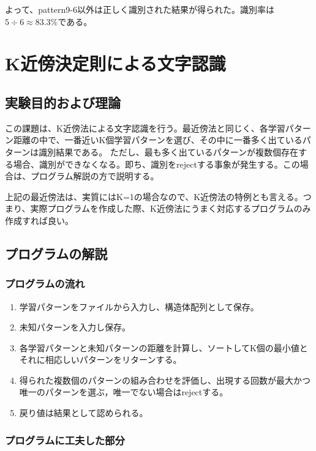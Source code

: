 \documentclass[ %
  uplatex,%
  papersize%
]{jsarticle}
\begin{document}
よって、pattern9-6以外は正しく識別された結果が得られた。識別率は$5\div6 \approx 83.3\%$である。

\section{K近傍決定則による文字認識}
\subsection{実験目的および理論}
この課題は、K近傍法による文字認識を行う。最近傍法と同じく、各学習パターン距離の中で、一番近いK個学習パターンを選び、その中に一番多く出ているパターンは識別結果である。
ただし、最も多く出ているパターンが複数個存在する場合、識別ができなくなる。即ち、識別をrejectする事象が発生する。この場合は、プログラム解説の方で説明する。

上記の最近傍法は、実質にはK=1の場合なので、K近傍法の特例とも言える。つまり、実際プログラムを作成した際、K近傍法にうまく対応するプログラムのみ作成すれば良い。

\subsection{プログラムの解説}
\subsubsection{プログラムの流れ}

\begin{enumerate}
\small
\item 学習パターンをファイルから入力し、構造体配列として保存。
\item 未知パターンを入力し保存。
\item 各学習パターンと未知パターンの距離を計算し、ソートしてK個の最小値とそれに相応しいパターンをリターンする。
\item 得られた複数個のパターンの組み合わせを評価し、出現する回数が最大かつ唯一のパターンを選ぶ，唯一でない場合はrejectする。
\item 戻り値は結果として認められる。
\end{enumerate}
\subsubsection{プログラムに工夫した部分}
\end{document}
